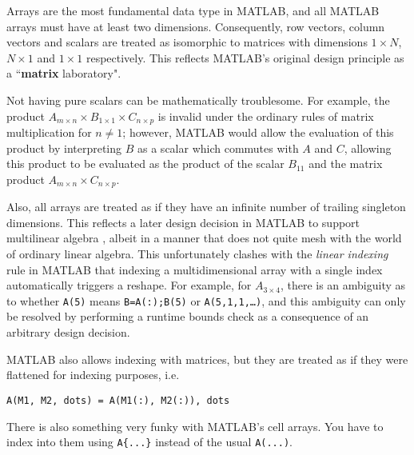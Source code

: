 \documentclass[preprint]{sigplanconf}
\newcommand{\MATLAB}{\textsc{MATLAB}}
\begin{document}
Arrays are the most fundamental data type in \MATLAB{}, and all \MATLAB{}
arrays must have at least two dimensions. Consequently, row vectors, column
vectors and scalars are treated as isomorphic to matrices with dimensions
$1\times N$, $N\times1$ and $1\times1$ respectively. This reflects \MATLAB's
original design principle as a ``\textbf{matrix} laboratory".

Not having pure scalars can be mathematically troublesome. For example, the
product $A_{m\times n} \times B_{1\times 1} \times C_{n\times p}$ is invalid
under the ordinary rules of matrix multiplication for $n\ne1$; however,
\MATLAB{} would allow the evaluation of this product by interpreting $B$ as a
scalar which commutes with $A$ and $C$, allowing this product to be evaluated
as the product of the scalar $B_{11}$ and the matrix product $A_{m\times n}
\times C_{n\times p}$.


Also, all arrays are treated as if they have an infinite number of trailing
singleton dimensions. This reflects a later design decision in \MATLAB{} to
support multilinear algebra \cite{matlabman:ma, Rose:1999tt}, albeit in a
manner that does not quite mesh with the world of ordinary linear algebra.
This unfortunately clashes with the \textit{linear indexing} rule in \MATLAB{}
that indexing a multidimensional array with a single index automatically
triggers a reshape. For example, for $A_{3\times4}$, there is an ambiguity as
to whether \texttt{A(5)} means \texttt{B=A(:);B(5)} or
\texttt{A(5,1,1,\dots)}, and this ambiguity can only be resolved by performing
a runtime bounds check as a consequence of an arbitrary design decision.

\MATLAB{} also allows indexing with matrices, but they are treated as if they
were flattened for indexing purposes, i.e.
\begin{verbatim}
A(M1, M2, dots) = A(M1(:), M2(:)), dots
\end{verbatim}

There is also something very funky with \MATLAB's cell arrays. You have to
index into them using \texttt{A\{...\}} instead of the usual \texttt{A(...)}.


\end{document}
